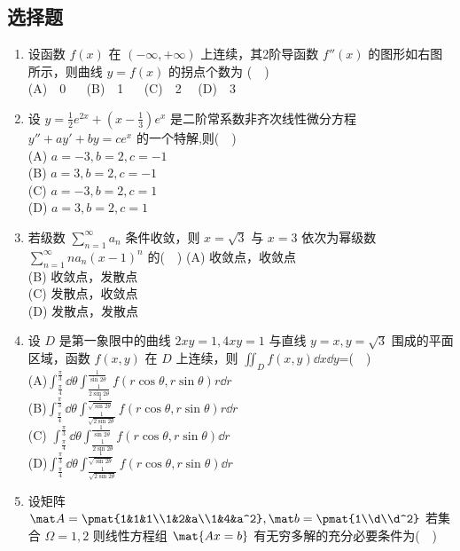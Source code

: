 \subsection{选择题}
\begin{enumerate}($\quad$)
\item 设函数 $f(x)$ 在 $(-\infty,+\infty)$ 上连续，其2阶导函数 $f''(x)$  的图形如右图所示，则曲线 $y=f(x)$ 的拐点个数为 ($\quad$)\\
(A)$\quad$0  $\quad$  (B)$\quad$1 $\quad$  (C)$\quad$2  $\quad$(D)$\quad$3 
\item 设 $y=\frac{1}{2}e^{2x}+(x-\frac{1}{3})e^x$ 是二阶常系数非齐次线性微分方程 $y''+ay'+by=ce^x$  的一个特解,则($\quad$)\\
(A) $a=-3,b=2,c=-1$\\
(B) $a=3,b=2,c=-1$\\
(C) $a=-3,b=2,c=1$\\
(D) $a=3,b=2,c=1$
\item 若级数 $\displaystyle \sum_{n=1}^\infty a_n $ 条件收敛，则 $x=\sqrt{3}$ 与 $x=3$  依次为幂级数 $\displaystyle \sum_{n=1}^\infty na_n(x-1)^n$  的($\quad$)
(A) 收敛点，收敛点\\
(B) 收敛点，发散点\\
(C) 发散点，收敛点\\
(D) 发散点，发散点
\item  设 $D$ 是第一象限中的曲线 $2xy=1,4xy=1$   与直线 $y=x,y=\sqrt{3}$  围成的平面区域，函数 $f(x,y)$   在 $D$ 上连续，则 $\displaystyle {\iint}_D f(x,y)\dd{x}\dd{y}$=($\quad$)\\
(A)$\displaystyle  \int_\frac{\pi}{4}^\frac{\pi}{3}\dd{\theta}\int_\frac{1}{2\sin 2\theta}^\frac{1}{\sin 2\theta}f(r\cos \theta,r\sin \theta)r\dd{r}$\\
(B)$\displaystyle  \int_\frac{\pi}{4}^\frac{\pi}{3}\dd{\theta}\int_\frac{1}{\sqrt{2\sin 2\theta}}^\frac{1}{\sqrt{\sin 2\theta}}f(r\cos \theta,r\sin \theta)r\dd{r}$\\
(C) $\displaystyle  \int_\frac{\pi}{4}^\frac{\pi}{3}\dd{\theta}\int_\frac{1}{2\sin 2\theta}^\frac{1}{\sin 2\theta}f(r\cos \theta,r\sin \theta)\dd{r}$\\
(D)$\displaystyle  \int_\frac{\pi}{4}^\frac{\pi}{3}\dd{\theta}\int_\frac{1}{\sqrt{2\sin 2\theta}}^\frac{1}{\sqrt{\sin 2\theta}}f(r\cos \theta,r\sin \theta)\dd{r}$
\item 设矩阵 $\mat A=\pmat{1&1&1\\1&2&a\\1&4&a^2},\mat b=\pmat{1\\d\\d^2}$  若集合 $\Omega={1,2}$ 则线性方程组 $\mat{ Ax=b}$  有无穷多解的充分必要条件为($\quad$)\\

\end{enumerate}
